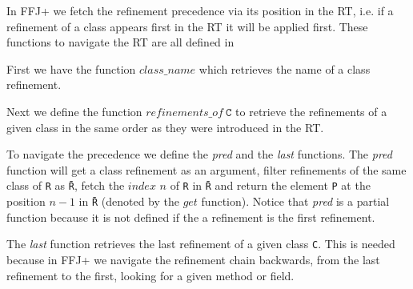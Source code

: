 In \gls{FFJ+} we fetch the refinement precedence via its position in the \textsf{RT}, i.e.
if a refinement of a class appears first in the \textsf{RT} it will be applied first. 
These functions to navigate the \textsf{RT} are all defined in 
    
First we have the function $class\_name$ which retrieves the name of a class refinement.

Next we define the function $refinements\_of~\texttt{C}$ to retrieve the refinements of 
a given class in the same order as they were introduced in the \textsf{RT}.

To navigate the precedence we define the \textit{pred} and the \textit{last} functions.
The \textit{pred} function will get a class refinement as an argument,
filter refinements of the same class of \texttt{R} as \texttt{\=R}, fetch the $index$ $n$ of \texttt{R} in \texttt{\=R} 
and return the element \texttt{P} at the position $n-1$ in \texttt{\=R} (denoted by the $get$ function). Notice that \textit{pred} is a partial function
because it is not defined if the a refinement is the first refinement.

The \textit{last} function retrieves the last refinement of a given class \texttt{C}.
This is needed because in \gls{FFJ+} we navigate the refinement chain backwards, from the last refinement
to the first, looking for a given method or field. 

